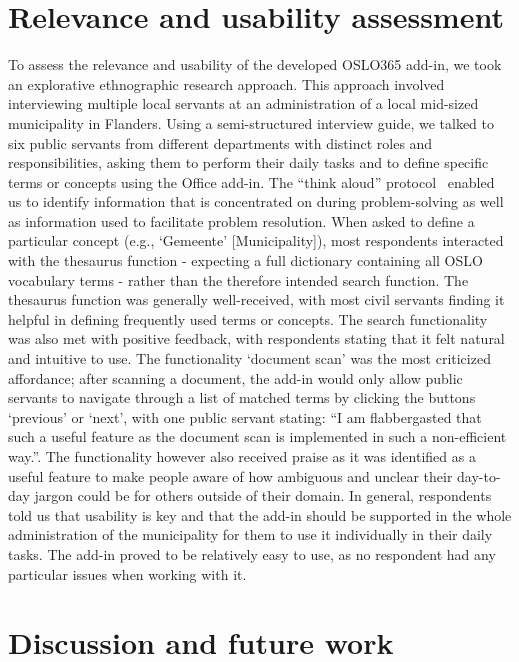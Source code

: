 \documentclass[manuscript]{acmart}
\begin{document}
\section{Relevance and usability assessment}

To assess the relevance and usability of the developed OSLO365 add-in, we took an explorative ethnographic research approach. 
This approach involved interviewing multiple local servants at an administration of a local mid-sized municipality in Flanders. 
Using a semi-structured interview guide, we talked to six public servants from different departments with distinct roles and responsibilities, asking them to perform their daily tasks and to define specific terms or concepts using the Office add-in. 
The ``think aloud'' protocol~\cite{jaaskelainen2010think} enabled us to identify information that is concentrated on during problem-solving as well as information used to facilitate problem resolution. 
When asked to define a particular concept (e.g., `Gemeente' [Municipality]), most respondents interacted with the thesaurus function - expecting a full dictionary containing all OSLO vocabulary terms - rather than the therefore intended search function. 
The thesaurus function was generally well-received, with most civil servants finding it helpful in defining frequently used terms or concepts. 
The search functionality was also met with positive feedback, with respondents stating that it felt natural and intuitive to use.  
The functionality `document scan' was the most criticized affordance; after scanning a document, the add-in would only allow public servants to navigate through a list of matched terms by clicking the buttons `previous' or `next', with one public servant stating: ``I am flabbergasted that such a useful feature as the document scan is implemented in such a non-efficient way.''. 
The functionality however also received praise as it was identified as a useful feature to make people aware of how ambiguous and unclear their day-to-day jargon could be for others outside of their domain.  
In general, respondents told us that usability is key and that the add-in should be supported in the whole administration of the municipality for them to use it individually in their daily tasks. 
The add-in proved to be relatively easy to use, as no respondent had any particular issues when working with it. 

\section{Discussion and future work}
\end{document}
